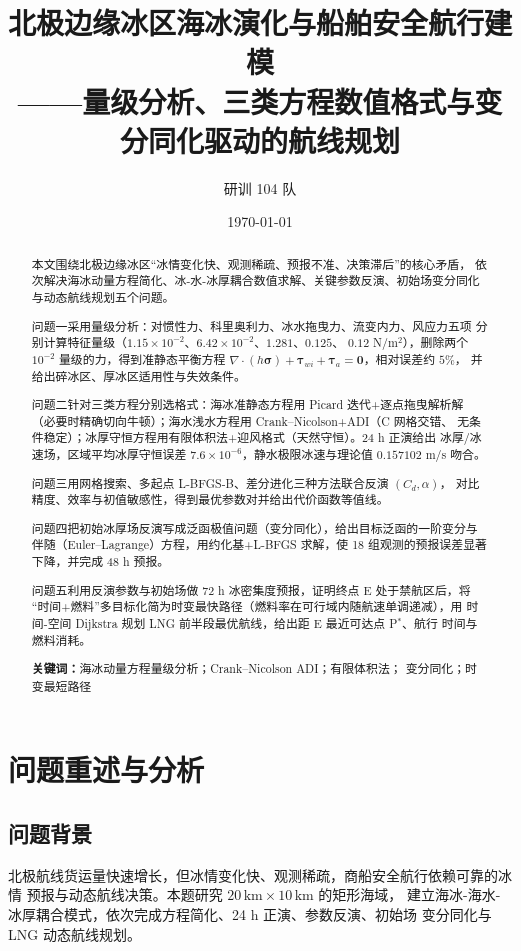 \documentclass[12pt]{ctexart}
\title{北极边缘冰区海冰演化与船舶安全航行建模\\
{\large ——量级分析、三类方程数值格式与变分同化驱动的航线规划}}
\author{研训 104 队}
\date{\today}
\newcommand{\ts}{\boldsymbol{\tau}}
\newcommand{\sig}{\boldsymbol{\sigma}}
\begin{document}
\maketitle

\begin{abstract}
本文围绕北极边缘冰区“冰情变化快、观测稀疏、预报不准、决策滞后”的核心矛盾，
依次解决海冰动量方程简化、冰-水-冰厚耦合数值求解、关键参数反演、初始场变分同化
与动态航线规划五个问题。

问题一采用量级分析：对惯性力、科里奥利力、冰水拖曳力、流变内力、风应力五项
分别计算特征量级（$1.15\times10^{-2}$、$6.42\times10^{-2}$、$1.281$、$0.125$、
$0.12$ N/m$^2$），删除两个 $10^{-2}$ 量级的力，得到准静态平衡方程
$\nabla\!\cdot\!(h\sig)+\ts_{wi}+\ts_a=\mathbf 0$，相对误差约 $5\%$，
并给出碎冰区、厚冰区适用性与失效条件。

问题二针对三类方程分别选格式：海冰准静态方程用 Picard 迭代+逐点拖曳解析解
（必要时精确切向牛顿）；海水浅水方程用 Crank--Nicolson+ADI（C 网格交错、
无条件稳定）；冰厚守恒方程用有限体积法+迎风格式（天然守恒）。24 h 正演给出
冰厚/冰速场，区域平均冰厚守恒误差 $7.6\times10^{-6}$，静水极限冰速与理论值
$0.157102$ m/s 吻合。

问题三用网格搜索、多起点 L-BFGS-B、差分进化三种方法联合反演 $(C_d,\alpha)$，
对比精度、效率与初值敏感性，得到最优参数对并给出代价函数等值线。

问题四把初始冰厚场反演写成泛函极值问题（变分同化），给出目标泛函的一阶变分与
伴随（Euler--Lagrange）方程，用约化基+L-BFGS 求解，使 18 组观测的预报误差显著
下降，并完成 48 h 预报。

问题五利用反演参数与初始场做 72 h 冰密集度预报，证明终点 E 处于禁航区后，将
“时间+燃料”多目标化简为时变最快路径（燃料率在可行域内随航速单调递减），用
时间-空间 Dijkstra 规划 LNG 前半段最优航线，给出距 E 最近可达点 P$^*$、航行
时间与燃料消耗。

\noindent\textbf{关键词：}海冰动量方程量级分析；Crank--Nicolson ADI；有限体积法；
变分同化；时变最短路径
\end{abstract}

\section{问题重述与分析}
\subsection{问题背景}
北极航线货运量快速增长，但冰情变化快、观测稀疏，商船安全航行依赖可靠的冰情
预报与动态航线决策。本题研究 $20\,\mathrm{km}\times 10\,\mathrm{km}$ 的矩形海域，
建立海冰-海水-冰厚耦合模式，依次完成方程简化、24 h 正演、参数反演、初始场
变分同化与 LNG 动态航线规划。
\end{document}
